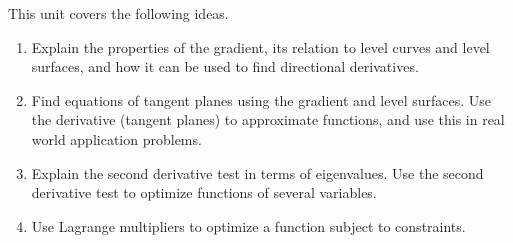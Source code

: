 
\noindent 
This unit covers the following ideas.  
\begin{enumerate}
\item Explain the properties of the gradient, its relation to level curves and level surfaces, and how it can be used to find directional derivatives.
\item Find equations of tangent planes using the gradient and level surfaces. Use the derivative (tangent planes) to approximate functions, and use this in real world application problems.
\item Explain the second derivative test in terms of eigenvalues. Use the second derivative test to optimize functions of several variables.
\item Use Lagrange multipliers to optimize a function subject to constraints. %
\end{enumerate}


